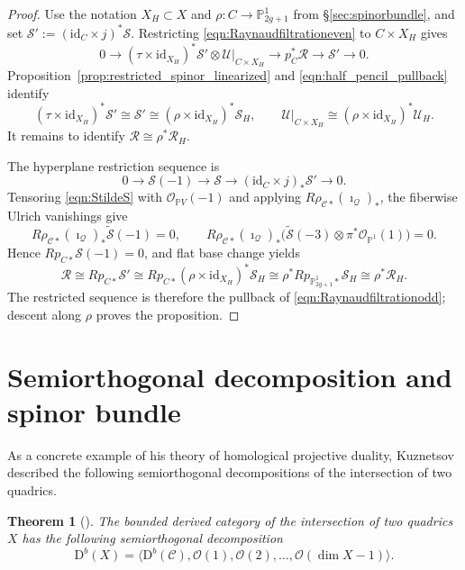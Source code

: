 \documentclass[12pt, letterpaper]{amsart}
\newtheorem{theorem}{Theorem}[section]
\theoremstyle{definition}
\newcommand{\PP}{\mathbb{P} }
\newcommand{\cC}{\mathcal{C} }
\newcommand{\cO}{\mathcal{O} }
\newcommand{\cQ}{\mathcal{Q} }
\newcommand{\cR}{\mathcal{R} }
\newcommand{\cS}{\mathcal{S} }
\newcommand{\cU}{\mathcal{U} }
\newcommand{\rD}{\mathrm{D} }
\begin{document}
\begin{proof}
Use the notation \(X_H\subset X\) and \(\rho:C\to\PP_{2g+1}^1\) from \S\ref{sec:spinorbundle}, and set \(\cS':=(\mathrm{id}_C\times j)^*\cS\). Restricting \eqref{eqn:Raynaudfiltrationeven} to \(C\times X_H\) gives
\[0 \longrightarrow (\tau \times \mathrm{id}_{X_H})^*\cS' \otimes \cU|_{C \times X_H} \longrightarrow p_C^*\cR \longrightarrow \cS' \longrightarrow 0.\]
Proposition~\ref{prop:restricted_spinor_linearized} and \eqref{eqn:half_pencil_pullback} identify
\[(\tau\times\mathrm{id}_{X_H})^*\cS'\cong\cS' \cong(\rho\times\mathrm{id}_{X_H})^*\cS_H, \qquad \cU|_{C\times X_H}\cong(\rho\times\mathrm{id}_{X_H})^*\cU_H.\]
It remains to identify \(\cR\cong\rho^*\cR_H\).

The hyperplane restriction sequence is
\[0 \longrightarrow \cS(-1) \longrightarrow \cS \longrightarrow (\mathrm{id}_C \times j)_*\cS' \longrightarrow 0.\]
Tensoring \eqref{eqn:StildeS} with \(\cO_{\PP V}(-1)\) and applying
\(R\rho_{\cC*}(\imath_{\cQ})_*\), the fiberwise Ulrich vanishings give
\[R\rho_{\cC*}(\imath_{\cQ})_*\widetilde{\cS}(-1)=0,\qquad R\rho_{\cC*}(\imath_{\cQ})_*\bigl(\widetilde{\cS}(-3)\otimes\pi^*\cO_{\PP^1}(1)\bigr)=0.\]
Hence \(Rp_{C*}\cS(-1)=0\), and flat base change yields
\[\cR\cong Rp_{C*}\cS' \cong Rp_{C*}(\rho\times\mathrm{id}_{X_H})^*\cS_H \cong\rho^*Rp_{\PP_{2g+1}^1*}\cS_H \cong\rho^*\cR_H.\]
The restricted sequence is therefore the pullback of \eqref{eqn:Raynaudfiltrationodd}; descent along \(\rho\) proves the proposition.
\end{proof}

\section{Semiorthogonal decomposition and spinor bundle}\label{sec:SOD}

As a concrete example of his theory of homological projective duality, Kuznetsov described the following semiorthogonal decompositions of the intersection of two quadrics.

\begin{theorem}[]\label{thm:SOD}
The bounded derived category of the intersection of two quadrics \(X\) has the following semiorthogonal decomposition
\begin{equation}\label{eqn:SOD}
\rD^b(X) = \langle \rD^b(\cC), \cO(1), \cO(2), \dots, \cO(\dim X - 1)\rangle.
\end{equation}
\end{theorem}
\end{document}
